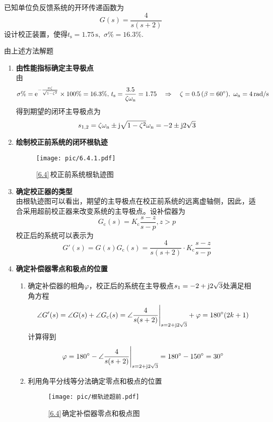 \examples \label{6.4}已知单位负反馈系统的开环传递函数为
\begin{equation}
	G(s) = \dfrac{4}{s(s+2)}
\end{equation}
设计校正装置，使得$t_\text{s} = 1.75 \, \text{s},\,\, \sigma \% = 16.3\%.$

\solve 由上述方法解题
\begin{enumerate}
	\item \textbf{由性能指标确定主导极点}\\
	由
	\[
	\sigma \% = {\rm{e}}^{-\frac{\pi \zeta}{\sqrt{1 - \zeta^2}}} \times 100\% = 16.3\%, \, t_\text{s} = \dfrac{3.5}{\zeta \omega_{{\rm{n}}}} = 1.75 \quad \Rightarrow \quad \zeta = 0.5\,(\beta = 60 {}^{\circ}),\,\, \omega_{{\rm{n}}} = 4 \,\text{rad/s}
	\]
	得到期望的闭环主导极点为
	\[
	s_{1,2} = \zeta \omega_{{\rm{n}}} \pm \text{j}\sqrt{1 - \zeta^2}\omega_{{\rm{n}}} = -2 \pm  \text{j}2\sqrt{3}
	\]
	
	\item \textbf{绘制校正前系统的闭环根轨迹}
	\begin{figure}[!htb]
		\centering
		\texttt{[image: pic/6.4.1.pdf]}
		\caption{\ref{6.4}$\,$校正前系统根轨迹图}
	\end{figure}
	
	\item \textbf{确定校正器的类型}\\
	由根轨迹图可以看出，期望的主导极点在校正前系统的远离虚轴侧，因此，适合采用超前校正器来改变系统的主导极点。设补偿器为
	\[
	G_\text{c}(s) = K_\text{c}\dfrac{s - z}{s -p}, z>p
	\]
	校正后的系统可以表示为
	\[
	G'(s) = G(s)G_\text{c}(s) = \dfrac{4}{s(s+2)}\cdot K_\text{c}\dfrac{s-z}{s-p}
	\]
	
	\item \textbf{确定补偿器零点和极点的位置}
	\begin{enumerate}[1.]
		\item 确定补偿器的相角$\varphi$，校正后的系统在主导极点$s_1 = -2 + \text{j} 2 \sqrt{3}$处满足相角方程
		\[
		\angle G'(s) = \angle G(s) + \angle G_\text{c}(s) = \angle \dfrac{4}{s(s+2)}\Bigg|_{s = 2 + \text{j} 2 \sqrt{3}} + \varphi = 180{}^{\circ}(2k + 1)
		\]
		计算得到
		\[
			\varphi = 180{}^{\circ} -  \angle \dfrac{4}{s(s+2)}\Bigg|_{s = 2 + \text{j} 2 \sqrt{3}} = 180 {}^{\circ} - 150{}^{\circ} = 30 {}^{\circ}
		\]
		
		\item 利用角平分线等分法确定零点和极点的位置
		\begin{figure}[!htb]
			\centering
			\texttt{[image: pic/根轨迹超前.pdf]}
			\vspace*{-1em}
			\caption{\ref{6.4}$\,$确定补偿器零点和极点图}
			\label{F6.4}
		\end{figure}
	

\end{enumerate}
\end{enumerate}
